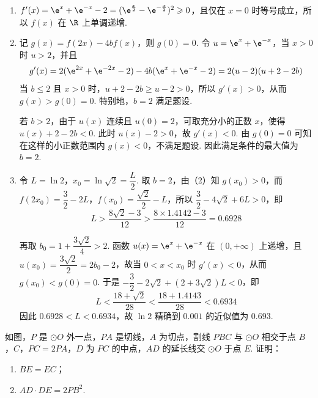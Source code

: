 \begin{solution}
\begin{enumerate}
\item \(f'(x)=\e^x+\e^{-x}-2=(\e^{\frac{x}{2}}-\e^{-\frac{x}{2}})^2\geqslant0\)，且仅在 \(x=0\) 时等号成立，所以 \(f(x)\) 在 \(\R\) 上单调递增.

\item 记 \(g(x)=f(2x)-4bf(x)\)，则 \(g(0)=0\). 令 \(u=\e^x+\e^{-x}\)，当 \(x>0\) 时 \(u>2\)，并且
\[
g'(x)=2(\e^{2x}+\e^{-2x}-2)-4b(\e^x+\e^{-x}-2)=2(u-2)(u+2-2b)
\]
当 \(b\leqslant2\) 且 \(x>0\) 时，\(u+2-2b\geqslant u-2>0\)，所以 \(g'(x)>0\)，从而 \(g(x)>g(0)=0\). 特别地，\(b=2\) 满足题设.

若 \(b>2\)，由于 \(u(x)\) 连续且 \(u(0)=2\)，可取充分小的正数 \(x\)，使得 \(u(x)+2-2b<0\). 此时 \(u(x)-2>0\)，故 \(g'(x)<0\). 由 \(g(0)=0\) 可知在这样的小正数范围内 \(g(x)<0\)，不满足题设. 因此满足条件的最大值为 \(b=2\).

\item 令 \(L=\ln2\)，\(x_0=\ln\sqrt{2}=\dfrac{L}{2}\). 取 \(b=2\)，由（2）知 \(g(x_0)>0\)，而
\(f(2x_0)=\dfrac{3}{2}-2L\)，\(f(x_0)=\dfrac{\sqrt{2}}{2}-L\)，所以
\(\dfrac{3}{2}-4\sqrt{2}+6L>0\)，即
\[
L>\frac{8\sqrt{2}-3}{12}>\frac{8\times1.4142-3}{12}=0.6928
\]

再取 \(b_0=1+\dfrac{3\sqrt{2}}{4}>2\). 函数 \(u(x)=\e^x+\e^{-x}\) 在 \((0,+\infty)\) 上递增，且 \(u(x_0)=\dfrac{3\sqrt{2}}{2}=2b_0-2\)，故当 \(0<x<x_0\) 时 \(g'(x)<0\)，从而 \(g(x_0)<g(0)=0\). 于是
\(-\dfrac{3}{2}-2\sqrt{2}+(2+3\sqrt{2})L<0\)，即
\[
L<\frac{18+\sqrt{2}}{28}<\frac{18+1.4143}{28}<0.6934
\]
因此 \(0.6928<L<0.6934\)，故 \(\ln2\) 精确到 \(0.001\) 的近似值为 \(0.693\).
\end{enumerate}
\end{solution}

\begin{problem}
如图，\(P\) 是 \(\odot O\) 外一点，\(PA\) 是切线，\(A\) 为切点，割线 \(PBC\) 与 \(\odot O\) 相交于点 \(B\)，\(C\)，\(PC=2PA\)，\(D\) 为 \(PC\) 的中点，\(AD\) 的延长线交 \(\odot O\) 于点 \(E\). 证明：
\begin{enumerate}
\item \(BE=EC\)；
\item \(AD\cdot DE=2PB^2\).
\end{enumerate}

\end{problem}


